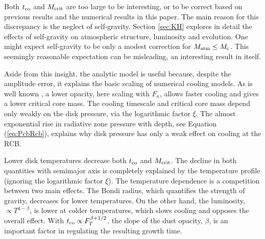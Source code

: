 \documentclass[apj, numberedappendix]{emulateapj}
\newcommand{\Eq}[1]{Equation\,(\ref{#1})}
\newcommand{\co}{_{\rm c}}
\newcommand{\MC}{M_{\rm crit}}
\begin{document}
Both $t_{\rm co}$ and $\MC$ are too large to be interesting, or to be correct based on previous results and the numerical results in this paper.  The main reason for this discrepancy is the neglect of self-gravity.  Section \ref{sec:KH} explores in detail the effects of self-gravity on atmospheric structure, luminosity and evolution.  One might expect self-gravity to be only a modest correction for $M_{\rm atm} \leq M\co$.   This seemingly reasonable expectation can be misleading, an interesting result in itself.

Aside from this insight, the analytic model is useful because, despite the amplitude error, it explains the basic scaling of numerical cooling models.  As is well known \citep{HubBod05}, a lower opacity, here scaling with $F_\kappa$, allows faster cooling and gives a lower critical core mass.  The cooling timescale and critical core mass depend only weakly on the disk pressure, via the logarithmic factor $\xi$.   The almost exponential rise in radiative zone pressure with depth, see \Eq{eq:PcbRcb}, explains why disk pressure has only a weak effect on cooling at the RCB.  %

Lower disk temperatures decrease both $t_{\rm co}$ and $\MC$.  The decline in both quantities with semimajor axis is completely explained by the temperature  profile (ignoring the logarithmic factor $\xi$).  The temperature dependence is a competition between two main effects.   The Bondi radius, which quantifies the strength of gravity, decreases for lower temperatures. On the other hand, the luminosity, $\propto T^{4-\beta}$, is lower at colder temperatures, which slows cooling and opposes the overall effect.  With $t_{\rm co} \propto F_T^{ \beta + 1/2}$, the slope of the dust opacity,  $\beta$, is an important factor in regulating the resulting growth time.
\end{document}
